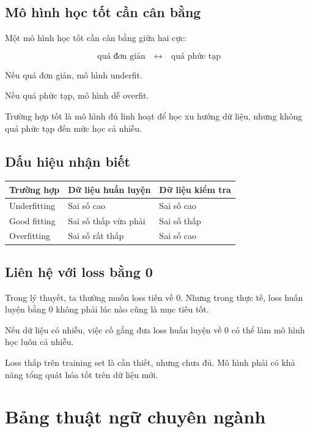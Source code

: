 \documentclass[12pt,a4paper]{report}
\begin{document}
\section{Mô hình học tốt cần cân bằng}

Một mô hình học tốt cần cân bằng giữa hai cực:

\[
    \text{quá đơn giản}
    \quad \longleftrightarrow \quad
    \text{quá phức tạp}
\]

Nếu quá đơn giản, mô hình underfit.

Nếu quá phức tạp, mô hình dễ overfit.

Trường hợp tốt là mô hình đủ linh hoạt để học xu hướng dữ liệu, nhưng không quá phức tạp đến mức học cả nhiễu.

\section{Dấu hiệu nhận biết}

\begin{center}
\begin{tabular}{p{}p{}p{}}
\toprule
Trường hợp & Dữ liệu huấn luyện & Dữ liệu kiểm tra \\
\midrule
Underfitting & Sai số cao & Sai số cao \\
Good fitting & Sai số thấp vừa phải & Sai số thấp \\
Overfitting & Sai số rất thấp & Sai số cao \\
\bottomrule
\end{tabular}
\end{center}

\section{Liên hệ với loss bằng 0}

Trong lý thuyết, ta thường muốn loss tiến về 0. Nhưng trong thực tế, loss huấn luyện bằng 0 không phải lúc nào cũng là mục tiêu tốt.

Nếu dữ liệu có nhiễu, việc cố gắng đưa loss huấn luyện về 0 có thể làm mô hình học luôn cả nhiễu.

\begin{ghinho}
Loss thấp trên training set là cần thiết, nhưng chưa đủ. Mô hình phải có khả năng tổng quát hóa tốt trên dữ liệu mới.
\end{ghinho}

\chapter{Bảng thuật ngữ chuyên ngành}
\end{document}
